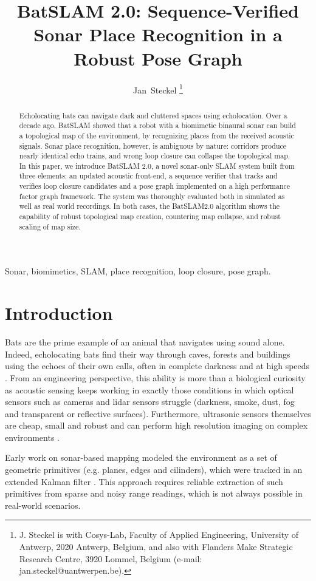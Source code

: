 \documentclass[journal]{IEEEtran}
\title{BatSLAM 2.0: Sequence-Verified Sonar Place Recognition in a Robust Pose Graph}
\author{Jan~Steckel%
\thanks{J. Steckel is with Cosys-Lab, Faculty of Applied Engineering, University of Antwerp, 2020 Antwerp, Belgium, and also with Flanders Make Strategic Research Centre, 3920 Lommel, Belgium (e-mail: jan.steckel@uantwerpen.be).}}
\begin{document}
\maketitle

\begin{abstract}
Echolocating bats can navigate dark and cluttered spaces using echolocation. Over a decade ago, BatSLAM showed that a robot with a biomimetic binaural sonar can build a topological map of the environment, by recognizing places from the received acoustic signals. Sonar place recognition, however, is ambiguous by nature: corridors produce nearly identical echo trains, and wrong loop closure can collapse the topological map. In this paper, we introduce BatSLAM 2.0, a novel sonar-only SLAM system built from three elements: an updated acoustic front-end, a sequence verifier that tracks and verifies loop closure candidates and a pose graph implemented on a high performance factor graph framework. The system was thoroughly evaluated both in simulated as well as real world recordings. In both cases, the BatSLAM2.0 algorithm shows the capability of robust topological map creation, countering map collapse, and robust scaling of map size.
\end{abstract}

\begin{IEEEkeywords}
Sonar, biomimetics, SLAM, place recognition, loop closure, pose graph.
\end{IEEEkeywords}

\section{Introduction}
Bats are the prime example of an animal that navigates using sound alone. Indeed, echolocating bats find their way through caves, forests and buildings using the echoes of their own calls, often in complete darkness and at high speeds \cite{griffinListeningDarkAcoustic1958, ulanovskyWhatBatVoice2008}. From an engineering perspective, this ability is more than a biological curiosity as acoustic sensing keeps working in exactly those conditions in which optical sensors such as cameras and lidar sensors struggle (darkness, smoke, dust, fog and transparent or reflective surfaces). Furthermore, ultrasonic sensors themselves are cheap, small and robust and can perform high resolution imaging on complex environments \cite{steckelBroadband3DSonar2013, kerstensERTISFullyEmbedded2019}. 

Early work on sonar-based mapping modeled the environment as a set of geometric primitives (e.g. planes, edges and cilinders), which were tracked in an extended Kalman filter \cite{leonardMobileRobotLocalization1991, tardosRobustMappingLocalization2002}. This approach requires reliable extraction of such primitives from sparse and noisy range readings, which is not always possible in real-world scenarios.
\end{document}
